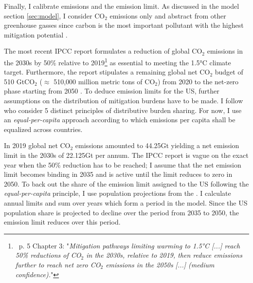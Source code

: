  Finally, I calibrate emissions and the emission limit. As discussed in the model section \ref{sec:model},  I consider CO$_2$ emissions only and abstract from other greenhouse gasses since carbon is the most important pollutant with the highest mitigation potential \citep[p.29]{IPCC2022}.
 
 The most recent IPCC report \citep{IPCC2022} formulates a reduction of global CO$_2$ emissions in the 2030s by 50\% relative to 2019\footnote{\ p. 5 Chapter 3: "\textit{Mitigation pathways limiting warming to 1.5°C [...] reach 50\% reductions of CO$_2$ in the 2030s, relative to 2019, then reduce emissions further to reach net zero CO$_2$ emissions in the 2050s [...] (\textnormal{medium confidence}).}"}  as essential to meeting the 1.5°C climate target.  Furthermore, the report stipulates a remaining global net CO$_2$ budget of 510 GtCO$_2$ ($\approx$ 510,000 million metric tons of CO$_2$) from 2020 to the net-zero phase starting from 2050 \citep[p.5, Chapter3,]{IPCC2022}. 
To deduce emission limits for the US, further assumptions on the distribution of mitigation burdens have to be made. I follow \cite{RobiouDuPont2017EquitableGoals} who consider 5 distinct principles of distributive burden sharing. For now, I use an \textit{equal-per-capita} approach according to which emissions per capita shall be equalized across countries. 

 
% 
 In 2019 global net CO$_2$ emissions amounted to 44.25Gt \citep[compare figure SPM1.a p.11 in ][]{IPCCSPM} yielding a net emission limit in the 2030s of 22.125Gt per annum. The IPCC report is vague on the exact year when the 50\% reduction has to be reached; I assume that the net emission limit becomes binding in 2035 and is active until the limit reduces to zero in 2050. 
 To back out the share of the emission limit assigned to the US following the \textit{equal-per-capita} principle, I use population projections from the \cite{UNPOP}. %
 I calculate annual limits and sum over years which form a period in the model.  Since the US population share is projected to decline over the period from 2035 to 2050, the emission limit reduces over this period. 
 
